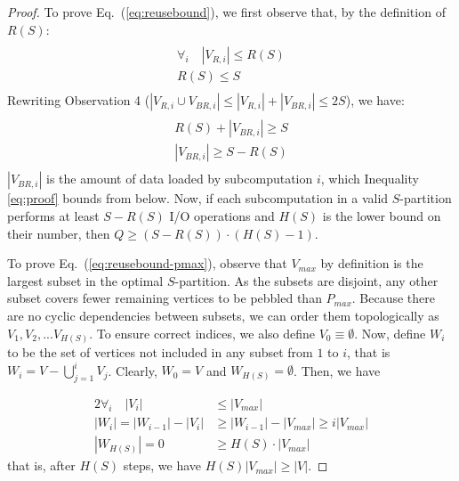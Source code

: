 \documentclass[sigplan,review,anonymous]{acmart}\settopmatter{printfolios=true,printccs=false,printacmref=false}
\begin{document}
\begin{proof}
%
To prove Eq.~(\ref{eq:reusebound}), we first observe that, by the 
definition of 
$R(S)$:
\begin{multline}
\nonumber
\\
\forall_{i}\quad |V_{R,i}| \le R(S) \\
R(S) \le S \\
\end{multline}
Rewriting Observation 4 ($|V_{R,i} \cup V_{BR,i}| \le |V_{R,i}| + |V_{BR,i}| 
\le 2S$), we have:
\begin{multline}
\label{eq:proof}
\\
  R(S) + |V_{BR,i}| \ge S\\
  |V_{BR,i}| \ge S - R(S)\\
\end{multline}
$|V_{BR,i}|$ is the amount of data loaded by subcomputation $i$, which 
Inequality \ref{eq:proof} bounds from below. Now, if each subcomputation in a 
valid $S$-partition performs at least $S - R(S)$ I/O operations and $H(S)$ is 
the lower bound on their number, then $Q \ge (S - R(S)) \cdot (H(S) - 1)$.

To prove Eq.~(\ref{eq:reusebound-pmax}), observe that $V_{max}$ by definition
is the largest subset in the optimal $S$-partition. As the subsets are
disjoint, any other subset covers fewer remaining vertices to be pebbled than
$P_{max}$. Because there are no cyclic dependencies between subsets, we can
order them topologically as $V_1, V_2, ...V_{H(S)}$. To ensure correct indices,
we also define $V_0 \equiv \emptyset$. Now, define $W_i$ to be the set
of vertices not included in any subset from $1$ to $i$, that is $W_i = V -
\bigcup_{j=1}^{i} V_j$. Clearly, $W_0 = V$ and $W_{H(S)} = \emptyset$. Then, we
have

\begin{alignat}{2}
%
\nonumber
\forall_{i}\quad |V_i| & \le |V_{max}| \\
\nonumber
|W_i| = |W_{i-1}| - |V_i| & \ge |W_{i-1}| - |V_{max}| \ge i|V_{max}| \\
\nonumber
|W_{H(S)}| = 0 & \ge H(S) \cdot |V_{max}| 
%
\end{alignat}
%
that is, after $H(S)$ steps, we have $H(S) |V_{max}| \ge |V|$.
\end{proof}

\end{document}
